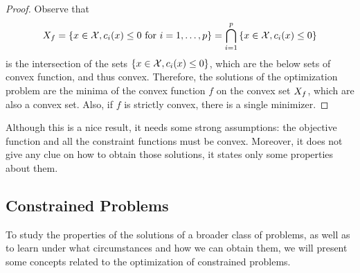 \begin{proof}
    Observe that
    $$X_f = \left\{x \in \mathcal{X}, c_i(x) \leq 0 \text{ for } i=1, \ldots, p\right\} = \bigcap_{i=1}^p \left\{x \in \mathcal{X}, c_i(x) \leq 0\right\}$$ 
    is the intersection of the sets $\left\{x \in \mathcal{X}, c_i(x) \leq 0\right\}$, which are the below sets of convex function, and thus convex. Therefore, the solutions of the optimization problem are the minima of the convex function $f$ on the convex set $X_f$, which are also a convex set.
    Also, if $f$ is strictly convex, there is a single minimizer.
\end{proof}
Although this is a nice result, it needs some strong assumptions: the objective function and all the constraint functions must be convex. Moreover, it does not give any clue on how to obtain those solutions, it states only some properties about them.
%






\subsection{Constrained Problems}
To study the properties of the solutions of a broader class of problems, as well as to learn under what circumstances and how we can obtain them, we will present some concepts related to the optimization of constrained problems.
%

